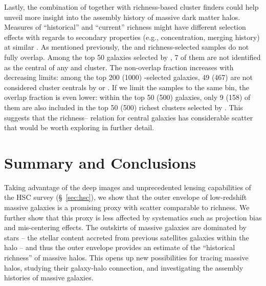 \documentclass[fleqn,usenatbib,useAMS]{mnras}
\begin{document}
    Lastly, the combination of \mstar{} together with richness-based cluster finders could help
    unveil more insight into the assembly history of massive dark matter halos. 
    Measures of ``historical'' and ``current'' richness might have different selection effects with
    regards to secondary properties (e.g., concentration, merging history) at similar \mvir{}.
    As mentioned previously, the \mstar{} and richness-selected samples do not fully overlap.
    Among the top 50 galaxies selected by , 7 of them are not identified as the
    central of any \redm{} and \camira{} cluster.
    The non-overlap fraction increases with decreasing \mstar{} limits: among the top 200 (1000)
    -selected galaxies, 49 (467) are not considered cluster centrals by \redm{} or
    \camira{}.
    If we limit the samples to the same \topn{} bin, the overlap fraction is even lower: within the
    top 50 (500)  galaxies, only 9 (158) of them are also included in the top 50
    (500) richest clusters selected by \redm{}. This suggests that the richness--\mstar{} relation
    for central galaxies has considerable scatter that would be worth exploring in further detail.

\section{Summary and Conclusions}
    \label{sec:summary}

    Taking advantage of the deep images and unprecedented lensing capabilities of the HSC survey
    (\S\ \ref{sec:hsc}), we show that the outer envelope of low-redshift massive galaxies is a
    promising \mvir{} proxy with scatter comparable to richness. 
    We further show that this proxy is less affected by systematics such as projection bias and
    mis-centering effects. 
    The outskirts of massive galaxies are dominated by \exsitu{} stars -- the stellar content
    accreted from previous satellites galaxies within the halo -- and thus the outer envelope
    \mstar{} provides an estimate of the ``historical richness'' of massive halos.
    This opens up new possibilities for tracing massive halos, studying their galaxy-halo connection,
    and investigating the assembly histories of massive galaxies.
    
\end{document}
